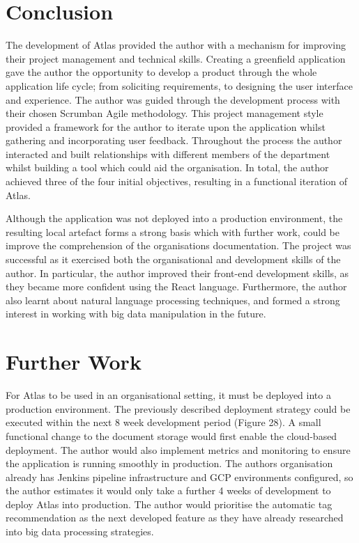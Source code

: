 \documentclass{article}
\begin{document}
\newpage
\section{Conclusion}

The development  of Atlas provided the author with a mechanism for improving their project management and technical skills. Creating a greenfield application gave the author the opportunity to develop a product through the whole application life cycle; from soliciting requirements, to designing the user interface and experience. The author was guided through the development process with their chosen Scrumban Agile methodology. This project management style provided a framework for the author to iterate upon the application whilst gathering and incorporating user feedback. Throughout the process the author interacted and built relationships with different members of the department whilst building a tool which could aid the organisation. In total, the author achieved three of the four initial objectives, resulting in a functional iteration of Atlas.

Although the application was not deployed into a production environment, the resulting local artefact forms a strong basis which with further work, could be improve the comprehension of the organisations documentation. The project was successful as it exercised both the organisational and development skills of the author. In particular, the author improved their front-end development skills, as they became more confident using the React language. Furthermore, the author also learnt about natural language processing techniques, and formed a strong interest in working with big data manipulation in the future.

\newpage
\section{Further Work}

For Atlas to be used in an organisational setting, it must be deployed into a production environment. The previously described deployment strategy could be executed within the next 8 week development period (Figure 28). A small functional change to the document storage would first enable the cloud-based deployment. The author would also implement metrics and monitoring to ensure the application is running smoothly in production. The authors organisation already has Jenkins pipeline infrastructure and GCP environments configured, so the author estimates it would only take a further 4 weeks of development to deploy Atlas into production. The author would prioritise the automatic tag recommendation as the next developed feature as they have already researched into big data processing strategies.
\end{document}
